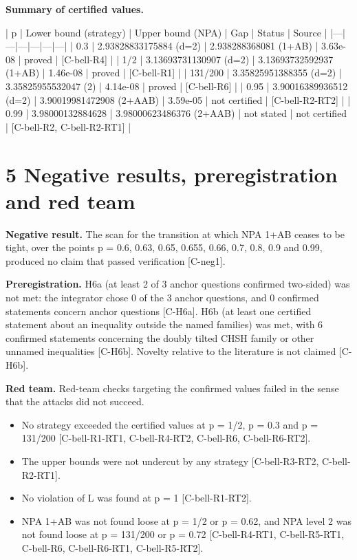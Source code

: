 \documentclass[10pt,twocolumn]{article}
\begin{document}
\textbf{Summary of certified values.}

| p | Lower bound (strategy) | Upper bound (NPA) | Gap | Status | Source |
|---|---|---|---|---|---|
| 0.3 | 2.93828833175884 (d=2) | 2.938288368081 (1+AB) | 3.63e-08 | proved | {\scriptsize[C-bell-R4]} |
| 1/2 | 3.13693731130907 (d=2) | 3.13693732592937 (1+AB) | 1.46e-08 | proved | {\scriptsize[C-bell-R1]} |
| 131/200 | 3.35825951388355 (d=2) | 3.35825955532047 (2) | 4.14e-08 | proved | {\scriptsize[C-bell-R6]} |
| 0.95 | 3.90016389936512 (d=2) | 3.90019981472908 (2+AAB) | 3.59e-05 | not certified | {\scriptsize[C-bell-R2-RT2]} |
| 0.99 | 3.98000132884628 | 3.98000623486376 (2+AAB) | not stated | not certified | {\scriptsize[C-bell-R2, C-bell-R2-RT1]} |

\section{5 Negative results, preregistration and red team}

\textbf{Negative result.} The scan for the transition at which NPA 1+AB ceases to be tight, over the points p = 0.6, 0.63, 0.65, 0.655, 0.66, 0.7, 0.8, 0.9 and 0.99, produced no claim that passed verification {\scriptsize[C-neg1]}.

\textbf{Preregistration.} H6a (at least 2 of 3 anchor questions confirmed two-sided) was not met: the integrator chose 0 of the 3 anchor questions, and 0 confirmed statements concern anchor questions {\scriptsize[C-H6a]}. H6b (at least one certified statement about an inequality outside the named families) was met, with 6 confirmed statements concerning the doubly tilted CHSH family or other unnamed inequalities {\scriptsize[C-H6b]}. Novelty relative to the literature is not claimed {\scriptsize[C-H6b]}.

\textbf{Red team.} Red-team checks targeting the confirmed values failed in the sense that the attacks did not succeed.
\begin{itemize}
\item No strategy exceeded the certified values at p = 1/2, p = 0.3 and p = 131/200 {\scriptsize[C-bell-R1-RT1, C-bell-R4-RT2, C-bell-R6, C-bell-R6-RT2]}.
\item The upper bounds were not undercut by any strategy {\scriptsize[C-bell-R3-RT2, C-bell-R2-RT1]}.
\item No violation of L was found at p = 1 {\scriptsize[C-bell-R1-RT2]}.
\item NPA 1+AB was not found loose at p = 1/2 or p = 0.62, and NPA level 2 was not found loose at p = 131/200 or p = 0.72 {\scriptsize[C-bell-R4-RT1, C-bell-R5-RT1, C-bell-R6, C-bell-R6-RT1, C-bell-R5-RT2]}.
\end{itemize}
\end{document}
